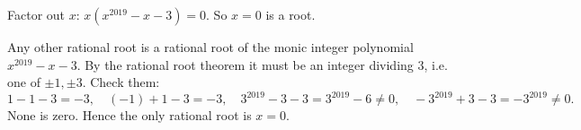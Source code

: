 Factor out $x$: $x\left(x^{2019}-x-3\right)=0$. So $x=0$ is a root.

Any other rational root is a rational root of the monic integer polynomial $x^{2019}-x-3$. By the rational root theorem it must be an integer dividing $3$, i.e. one of $\pm1,\pm3$. Check them:
\[
1-1-3=-3,\quad (-1)+1-3=-3,\quad 3^{2019}-3-3=3^{2019}-6\ne0,\quad -3^{2019}+3-3=-3^{2019}\ne0 .
\]
None is zero. Hence the only rational root is $\boxed{x=0}$.
